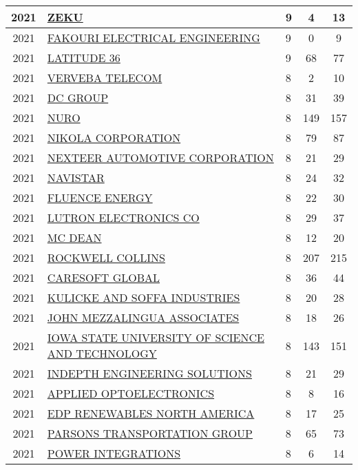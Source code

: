 \documentclass{article}%
\begin{document}
\begin{longtable}{c|p{20em}|p{5em}|c|c}
\hline%
2021&\hyperref[subsec:ZEKU]{ZEKU}&9&4&13\\%
\hline%
2021&\hyperref[subsec:FAKOURIELECTRICALENGINEERING]{FAKOURI ELECTRICAL ENGINEERING}&9&0&9\\%
\hline%
2021&\hyperref[subsec:LATITUDE36]{LATITUDE 36}&9&68&77\\%
\hline%
2021&\hyperref[subsec:VERVEBATELECOM]{VERVEBA TELECOM}&8&2&10\\%
\hline%
2021&\hyperref[subsec:DCGROUP]{DC GROUP}&8&31&39\\%
\hline%
2021&\hyperref[subsec:NURO]{NURO}&8&149&157\\%
\hline%
2021&\hyperref[subsec:NIKOLACORPORATION]{NIKOLA CORPORATION}&8&79&87\\%
\hline%
2021&\hyperref[subsec:NEXTEERAUTOMOTIVECORPORATION]{NEXTEER AUTOMOTIVE CORPORATION}&8&21&29\\%
\hline%
2021&\hyperref[subsec:NAVISTAR]{NAVISTAR}&8&24&32\\%
\hline%
2021&\hyperref[subsec:FLUENCEENERGY]{FLUENCE ENERGY}&8&22&30\\%
\hline%
2021&\hyperref[subsec:LUTRONELECTRONICSCO]{LUTRON ELECTRONICS CO}&8&29&37\\%
\hline%
2021&\hyperref[subsec:MCDEAN]{MC DEAN}&8&12&20\\%
\hline%
2021&\hyperref[subsec:ROCKWELLCOLLINS]{ROCKWELL COLLINS}&8&207&215\\%
\hline%
2021&\hyperref[subsec:CARESOFTGLOBAL]{CARESOFT GLOBAL}&8&36&44\\%
\hline%
2021&\hyperref[subsec:KULICKEANDSOFFAINDUSTRIES]{KULICKE AND SOFFA INDUSTRIES}&8&20&28\\%
\hline%
2021&\hyperref[subsec:JOHNMEZZALINGUAASSOCIATES]{JOHN MEZZALINGUA ASSOCIATES}&8&18&26\\%
\hline%
2021&\hyperref[subsec:IOWASTATEUNIVERSITYOFSCIENCEANDTECHNOLOGY]{IOWA STATE UNIVERSITY OF SCIENCE AND TECHNOLOGY}&8&143&151\\%
\hline%
2021&\hyperref[subsec:INDEPTHENGINEERINGSOLUTIONS]{INDEPTH ENGINEERING SOLUTIONS}&8&21&29\\%
\hline%
2021&\hyperref[subsec:APPLIEDOPTOELECTRONICS]{APPLIED OPTOELECTRONICS}&8&8&16\\%
\hline%
2021&\hyperref[subsec:EDPRENEWABLESNORTHAMERICA]{EDP RENEWABLES NORTH AMERICA}&8&17&25\\%
\hline%
2021&\hyperref[subsec:PARSONSTRANSPORTATIONGROUP]{PARSONS TRANSPORTATION GROUP}&8&65&73\\%
\hline%
2021&\hyperref[subsec:POWERINTEGRATIONS]{POWER INTEGRATIONS}&8&6&14\\%

\end{longtable}
\end{document}
